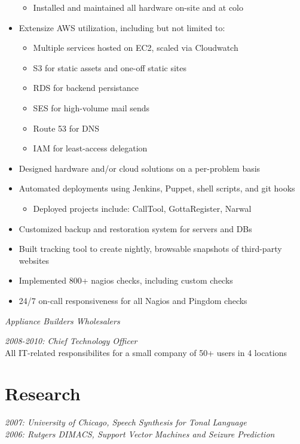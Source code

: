 \documentclass[11pt]{res} %
\begin{document}
\begin{resume}
\begin{itemize}
\begin{itemize}
                    \item Installed and maintained all hardware on-site and at colo
                \end{itemize}
            \item Extensize AWS utilization, including but not limited to:
                \begin{itemize}
                    \item Multiple services hosted on EC2, scaled via Cloudwatch
                    \item S3 for static assets and one-off static sites
                    \item RDS for backend persistance
                    \item SES for high-volume mail sends
                    \item Route 53 for DNS
                    \item IAM for least-access delegation
                \end{itemize}
            \item Designed hardware and/or cloud solutions on a per-problem basis
            \item Automated deployments using Jenkins, Puppet, shell scripts, and git hooks
                \begin{itemize}
                    \item Deployed projects include: CallTool, GottaRegister, Narwal
                \end{itemize}
            \item Customized backup and restoration system for servers and DBs
            \item Built tracking tool to create nightly, browsable snapshots of third-party websites
            \item Implemented 800+ nagios checks, including custom checks
            \item 24/7 on-call responsiveness for all Nagios and Pingdom checks
        \end{itemize}


\newpage
\sl{Appliance Builders Wholesalers} 
    \begin{itemize} 
        {\sl 2008-2010: Chief Technology Officer} \\ 
        All IT-related responsibilites for a small company of 50+ users in 4 locations
    \end{itemize}

\section{Research}
{\sl 2007: University of Chicago, Speech Synthesis for Tonal Language} \\
{\sl 2006: Rutgers DIMACS, Support Vector Machines and Seizure Prediction}


\end{resume}
\end{document}
